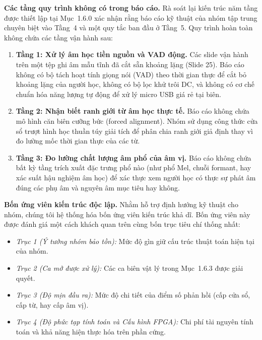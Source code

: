 \documentclass[11pt,a4paper]{article}
\begin{document}
\textbf{Các tầng quy trình không có trong báo cáo.} Rà soát lại kiến trúc năm tầng được thiết lập tại Mục~1.6.0 xác nhận rằng báo cáo kỹ thuật của nhóm tập trung chuyên biệt vào Tầng~4 và một quy tắc ban đầu ở Tầng~5. Quy trình hoàn toàn không chứa các tầng vận hành sau:
\begin{enumerate}
    \item \textbf{Tầng 1: Xử lý âm học tiền nguồn và VAD động.} Các slide vận hành trên một tệp ghi âm mẫu tĩnh đã cắt sẵn khoảng lặng (Slide 25). Báo cáo không có bộ tách hoạt tính giọng nói (VAD) theo thời gian thực để cắt bỏ khoảng lặng của người học, không có bộ lọc khử trôi DC, và không có cơ chế chuẩn hóa năng lượng tự động để xử lý micro USB giá rẻ tại biên.
    \item \textbf{Tầng 2: Nhận biết ranh giới từ âm học thực tế.} Báo cáo không chứa mô hình căn biên cưỡng bức (forced alignment). Nhóm sử dụng công thức cửa sổ trượt hình học thuần túy giải tích để phân chia ranh giới giả định thay vì đo lường mốc thời gian thực của các từ.
    \item \textbf{Tầng 3: Đo lường chất lượng âm phổ của âm vị.} Báo cáo không chứa bất kỳ tầng trích xuất đặc trưng phổ nào (như phổ Mel, chuỗi formant, hay xác suất hậu nghiệm âm học) để xác thực xem người học có thực sự phát âm đúng các phụ âm và nguyên âm mục tiêu hay không.
\end{enumerate}

\textbf{Bốn ứng viên kiến trúc độc lập.} Nhằm hỗ trợ định hướng kỹ thuật cho nhóm, chúng tôi hệ thống hóa bốn ứng viên kiến trúc khả dĩ. Bốn ứng viên này được đánh giá một cách khách quan trên cùng bốn trục tiêu chí thống nhất:
\begin{itemize}
    \item \textit{Trục 1 (Ý tưởng nhóm bảo tồn):} Mức độ gìn giữ cấu trúc thuật toán hiện tại của nhóm.
    \item \textit{Trục 2 (Ca mở được xử lý):} Các ca biên vật lý trong Mục~1.6.3 được giải quyết.
    \item \textit{Trục 3 (Độ mịn đầu ra):} Mức độ chi tiết của điểm số phản hồi (cấp cửa sổ, cấp từ, hay cấp âm vị).
    \item \textit{Trục 4 (Độ phức tạp tính toán và Cấu hình FPGA):} Chi phí tài nguyên tính toán và khả năng hiện thực hóa trên phần cứng.
\end{itemize}
\end{document}
